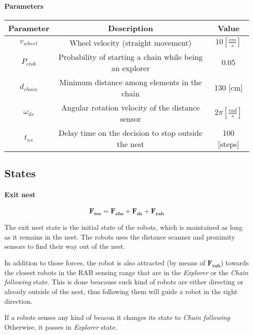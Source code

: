 \paragraph{Parameters}
\begin{center}
\begin{tabular}{|c|c|c|}
\hline
\textbf{Parameter} & \textbf{Description} & \textbf{Value} \\ \hline
$v_{wheel}$ & Wheel velocity (straight movement) & $10 [\frac{cm}{s}]$ \\ \hline
$P_{etob}$ & Probability of starting a chain while being an explorer & 0.05 \\ \hline
$d_{chain}$ & Minimum distance among elements in the chain  & 130 [cm] \\ \hline
$\omega_{ds}$ & Angular rotation velocity of the distance sensor & $2\pi [\frac{rad}{s}]$ \\ \hline
$t_{ns}$ & Delay time on the decision to stop outside the nest & 100 [steps] \\ \hline
\end{tabular}
\label{tab:parameters}
\end{center}

\subsection{States} \label{subsec:states}
\paragraph{Exit nest} \label{par:exitnest}
\begin{equation}
  \mathbf{F_{res}} = \mathbf{F_{obs}} + \mathbf{F_{ds}} + \mathbf{F_{rab}}
\end{equation}

The exit nest state is the initial state of the robots, which is maintained as long as it remains in the nest.
The robots uses the distance scanner and proximity sensors to find their way out 
of the nest.

In addition to those forces, the robot is also attracted (by means of $\mathbf{F_{rab}}$) 
towards the closest robots in the RAB sensing range that are in the \emph{Explorer} 
or the \emph{Chain following} state.
This is done beacause such kind of robots are either directing or already 
outside of the nest, thus following them will guide a robot in the right 
direction.

If a robots senses any kind of beacon it changes its state to \emph{Chain following}
Otherwise, it passes in \emph{Explorer} state.

